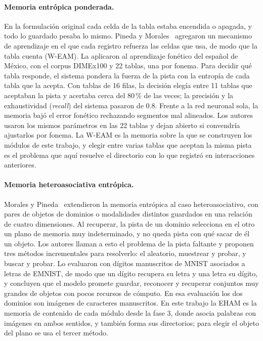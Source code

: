 \paragraph{Memoria entrópica ponderada.}
En la formulación original cada celda de la tabla estaba encendida o apagada, y todo lo
guardado pesaba lo mismo.
Pineda y Morales~\cite{pineda2022weighted} agregaron un mecanismo de aprendizaje en el que
cada registro refuerza las celdas que usa, de modo que la tabla cuenta (W-EAM).
La aplicaron al aprendizaje fonético del español de México, con el corpus DIMEx100 y 22
tablas, una por fonema.
Para decidir qué tabla responde, el sistema pondera la fuerza de la pista con la entropía
de cada tabla que la acepta.
Con tablas de 16 filas, la decisión elegía entre 11 tablas que aceptaban la pista y
acertaba cerca del 80\,\% de las veces; la precisión y la exhaustividad (\textit{recall}) del sistema
pasaron de 0.8.
Frente a la red neuronal sola, la memoria bajó el error fonético rechazando segmentos mal
alineados.
Los autores usaron los mismos parámetros en las 22 tablas y dejan abierto si convendría
ajustarlos por fonema.
La W-EAM es la memoria sobre la que se construyen los módulos de este trabajo, y elegir
entre varias tablas que aceptan la misma pista es el problema que aquí resuelve el
directorio con lo que registró en interacciones anteriores.

\paragraph{Memoria heteroasociativa entrópica.}
Morales y Pineda~\cite{morales2025missing} extendieron la memoria entrópica al caso
heteroasociativo, con pares de objetos de dominios o modalidades distintos guardados en
una relación de cuatro dimensiones.
Al recuperar, la pista de un dominio selecciona en el otro un plano de memoria muy
indeterminado, y no queda pista con qué sacar de él un objeto.
Los autores llaman a esto el problema de la pista faltante y proponen tres métodos
incrementales para resolverlo: el aleatorio, muestrear y probar, y buscar y probar.
Lo evaluaron con dígitos manuscritos de MNIST asociados a letras de EMNIST, de modo que un
dígito recupera su letra y una letra su dígito, y concluyen que el modelo promete guardar,
reconocer y recuperar conjuntos muy grandes de objetos con pocos recursos de cómputo.
En esa evaluación los dos dominios son imágenes de caracteres manuscritos.
En este trabajo la EHAM es la memoria de contenido de cada módulo desde la fase 3, donde
asocia palabras con imágenes en ambos sentidos, y también forma sus directorios; para
elegir el objeto del plano se usa el tercer método.


